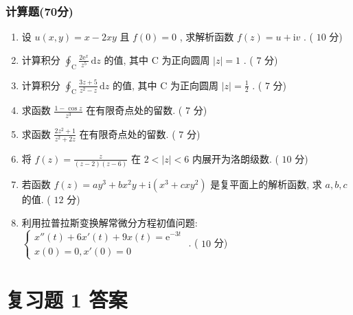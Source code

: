 \documentclass[cn,11pt,fancy,hide]{elegantbook}
\newcommand{\ee}{\mathrm{e}}
\newcommand{\dd}{\,\mathrm{d}}
\newcommand{\ii}{\mathrm{i}}
\begin{document}
\subsubsection{计算题(70分)}
\begin{enumerate}
	\item 设 $u(x,y)=x-2xy$ 且 $f(0)=0$ , 求解析函数 $f(z)=u+\ii v$ . ( $10$ 分)
	
	\item 计算积分 $\oint_{\mathrm{C}}\frac{2\ee^x}{z^5}\dd z$ 的值, 其中 $\mathrm{C}$ 为正向圆周 $|z|=1$ . ( $7$ 分)
	
	\item 计算积分 $\oint_{\mathrm{C}}\frac{3z+5}{z^2-z}\dd z$ 的值, 其中 $\mathrm{C}$ 为正向圆周 $|z|=\frac{1}{2}$ . ( $7$ 分)
	
	\item 求函数 $\frac{1-\cos z}{z^3}$ 在有限奇点处的留数. ( $7$ 分)
	
	\item 求函数 $\frac{2z^2+1}{z^2+2z}$ 在有限奇点处的留数. ( $7$ 分)
	
	\item 将 $f(z)=\frac{z}{(z-2)(z-6)}$ 在 $2<|z|<6$ 内展开为洛朗级数. ( $10$ 分)
	
	\item 若函数 $f(z)=a y^{3}+b x^{2} y+\ii\left(x^{3}+c x y^{2}\right)$ 是复平面上的解析函数, 求 $a,b,c$ 的值. ( $12$ 分)
	
	\item 利用拉普拉斯变换解常微分方程初值问题: $\begin{cases}
	x''(t)+6x'(t)+9x(t)=\ee^{-3t}\\
	x(0)=0, x'(0)=0
	\end{cases}$ . ( $10$ 分)
\end{enumerate}



\section{复习题 1 答案}
\end{document}
